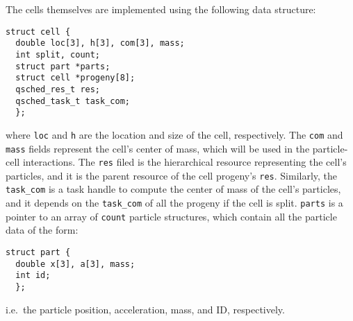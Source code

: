 \documentclass[preprint]{elsarticle}
\begin{document}
The cells themselves are implemented using the following 
data structure:
\begin{center}\begin{minipage}{0.9\textwidth}
    \begin{lstlisting}
struct cell {
  double loc[3], h[3], com[3], mass;
  int split, count;
  struct part *parts;
  struct cell *progeny[8];
  qsched_res_t res;
  qsched_task_t task_com;
  };
    \end{lstlisting}
\end{minipage}\end{center}
\noindent where {\tt loc} and {\tt h} are the location
and size of the cell, respectively.
The {\tt com} and {\tt mass} fields represent the cell's
center of mass, which will be used in the particle-cell interactions.
The {\tt res} filed is the hierarchical resource representing
the cell's particles, and it is the parent resource of the cell
progeny's {\tt res}.
Similarly, the {\tt task\_com} is a task handle to
compute the center of mass of the cell's particles, and 
it depends on the {\tt task\_com} of all the progeny if
the cell is split.
{\tt parts} is a pointer to an array of {\tt count} 
particle structures, which contain all the particle
data of the form:
\begin{center}\begin{minipage}{0.9\textwidth}
    \begin{lstlisting}
struct part {
  double x[3], a[3], mass;
  int id;
  };
    \end{lstlisting}
\end{minipage}\end{center}
\noindent i.e.~the particle position, acceleration, mass,
and ID, respectively.
\end{document}
